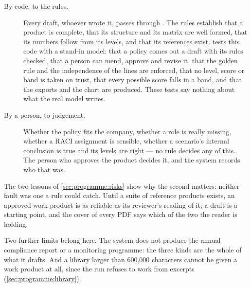\begin{description}
  \item[By code, to the rules.] Every draft, whoever wrote it, passes through
    . The rules establish that a product is complete, that its structure and
    its matrix are well formed, that its numbers follow from its levels, and that its
    references exist.  tests this code with a stand-in model:
    that a policy comes out a draft with its rules checked, that a person can mend, approve
    and revise it, that the golden rule and the independence of the lines are enforced, that
    no level, score or band is taken on trust, that every possible score falls in a band, and
    that the exports and the chart are produced. These tests say nothing about what the real
    model writes.
  \item[By a person, to judgement.] Whether the policy fits the company, whether a role is
    really missing, whether a RACI assignment is sensible, whether a scenario's internal
    conclusion is true and its levels are right --- no rule decides any of this. The person
    who approves the product decides it, and the system records who that was.
\end{description}

The two lessons of \cref{sec:programme:risks} show why the second matters: neither fault was
one a rule could catch. Until a suite of reference products exists, an approved work
product is as reliable as its reviewer's reading of it; a draft is a starting point, and the
cover of every PDF says which of the two the reader is holding.

Two further limits belong here. The system does not produce the annual compliance report or a
monitoring programme: the three kinds are the whole of what it drafts. And a library larger
than 600,000 characters cannot be given a work product at all, since the run refuses to work
from excerpts (\cref{sec:programme:library}).
